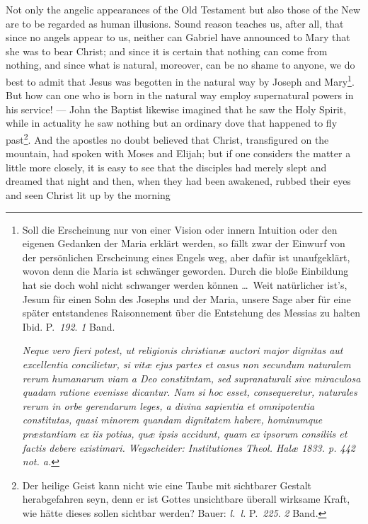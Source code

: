 \documentclass[12pt]{book}
\newcommand{\opage}[1]{\marginnote{\footnotesize\textit{[#1]}}}
\begin{document}
\opage{94} \setcounter{footnote}{0}%
Not only the angelic appearances of the Old Testament but also those of the
New are to be regarded as human illusions. Sound reason teaches us, after all,
that since no angels appear to us, neither can Gabriel have announced to Mary
that she was to bear Christ; and since it is certain that nothing can come from
nothing, and since what is natural, moreover, can be no shame to anyone, we do
best to admit that Jesus was begotten in the natural way by Joseph and
Mary\footnote{Soll die Erscheinung nur von einer Vision oder innern Intuition
oder den eigenen Gedanken der Maria erklärt werden, so fällt zwar der Einwurf
von der persönlichen Erscheinung eines Engels weg, aber dafür ist
unaufgeklärt, wovon denn die Maria ist schwänger geworden. Durch die bloße
Einbildung hat sie doch wohl nicht schwanger werden können \ldots\ Weit
natürlicher ist's, Jesum für einen Sohn des Josephs und der Maria, unsere Sage
aber für eine später entstandenes Raisonnement über die Entstehung des Messias
zu halten Ibid. P.~\textit{192}. \textit{1} Band.\par
\textit{Neque vero fieri potest, ut religionis christianæ auctori major dignitas
aut excellentia concilietur, si vitæ ejus partes et casus non secundum
naturalem rerum humanarum viam a Deo constitntam, sed supranaturali sive
miraculosa quadam ratione evenisse dicantur. Nam si hoc esset, consequeretur,
naturales rerum in orbe gerendarum leges, a divina sapientia et omnipotentia
constitutas, quasi minorem quandam dignitatem habere, hominumque præstantiam ex
iis potius, quæ ipsis accidunt, quam ex ipsorum consiliis et factis debere
existimari. Wegscheider: Institutiones Theol. Halæ 1833. p. 442 not. a.}}. But
how can one who is born in the natural way employ supernatural powers in his
service! --- John the Baptist likewise imagined that he saw the Holy Spirit,
while in actuality he saw nothing but an ordinary dove that happened to fly
\opage{95} %
\setcounter{footnote}{0}%
past\footnote{Der heilige Geist kann nicht wie eine Taube mit sichtbarer
Gestalt herabgefahren seyn, denn er ist Gottes unsichtbare überall wirksame
Kraft, wie hätte dieses sollen sichtbar werden? Bauer: \textit{l.~l.}
P.~\textit{225}. \textit{2} Band.}. And the apostles no doubt believed that
Christ, transfigured on the mountain, had spoken with Moses and Elijah; but if
one considers the matter a little more closely, it is easy to see that the
disciples had merely slept and dreamed that night and then, when they had been
awakened, rubbed their eyes and seen Christ lit up by the morning
\end{document}
